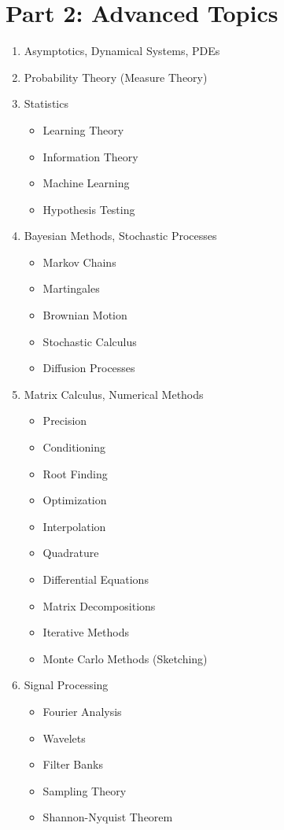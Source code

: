 \documentclass[12pt]{article}
\begin{document}
\section*{Part 2: Advanced Topics}
\begin{enumerate}
    \item Asymptotics, Dynamical Systems, PDEs
    \item Probability Theory (Measure Theory)
    \item Statistics 
    \begin{itemize}
        \item Learning Theory
        \item Information Theory
        \item Machine Learning
        \item Hypothesis Testing
    \end{itemize}
    \item Bayesian Methods, Stochastic Processes 
    \begin{itemize}
        \item Markov Chains
        \item Martingales
        \item Brownian Motion
        \item Stochastic Calculus
        \item Diffusion Processes
    \end{itemize}
    \item Matrix Calculus, Numerical Methods 
    \begin{itemize}
        \item Precision
        \item Conditioning
        \item Root Finding
        \item Optimization
        \item Interpolation
        \item Quadrature
        \item Differential Equations
        \item Matrix Decompositions
        \item Iterative Methods
        \item Monte Carlo Methods (Sketching)
    \end{itemize}
    \item Signal Processing 
    \begin{itemize}
        \item Fourier Analysis
        \item Wavelets
        \item Filter Banks
        \item Sampling Theory
        \item Shannon-Nyquist Theorem
    \end{itemize}


\end{enumerate}
\end{document}
